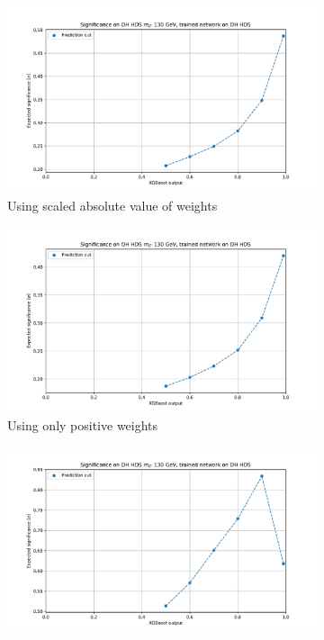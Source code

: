 \documentclass[12pt, a4paper]{book}
\begin{document}
\begin{figure}[!ht]
	\centering
	\begin{subfigure}[b]{0.49\textwidth}
      \centering
      \includegraphics[width=1\textwidth]{Abs_wgt/EXP_SIG.pdf}
      \caption{Using scaled absolute value of weights}
   \end{subfigure}
   \begin{subfigure}[b]{0.49\textwidth}
      \centering
      \includegraphics[width=1\textwidth]{Pos_wgt/EXP_SIG.pdf}
      \caption{Using only positive weights}
   \end{subfigure}
   \begin{subfigure}[b]{0.49\textwidth}
      \centering
      \includegraphics[width=1\textwidth]{No_wgt/EXP_SIG.pdf}

\end{subfigure}
\end{figure}
\end{document}
